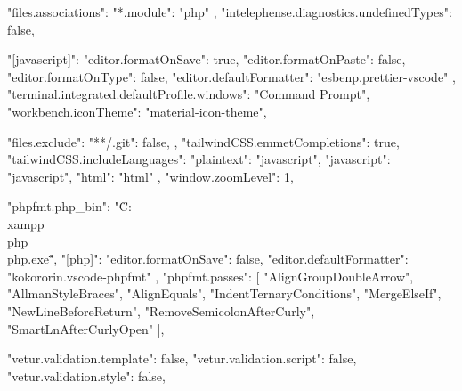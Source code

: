 {
    "files.associations": { "*.module": "php" },
    "intelephense.diagnostics.undefinedTypes": false,

    "[javascript]": {
        "editor.formatOnSave": true,
        "editor.formatOnPaste": false,
        "editor.formatOnType": false,
        "editor.defaultFormatter": "esbenp.prettier-vscode"
        },
        "terminal.integrated.defaultProfile.windows": "Command Prompt",
        "workbench.iconTheme": "material-icon-theme",
        
        
            "files.exclude": {
                "**/.git": false,
            },
            "tailwindCSS.emmetCompletions": true,
            "tailwindCSS.includeLanguages": {
            "plaintext": "javascript",
            "javascript": "javascript",
            "html": "html"
    },
            "window.zoomLevel": 1, 
          
            "phpfmt.php_bin": "\"C:\\xampp\\php\\php.exe\"",
            "[php]": {
                "editor.formatOnSave": false,
                "editor.defaultFormatter": "kokororin.vscode-phpfmt"
            },
            "phpfmt.passes": [
                "AlignGroupDoubleArrow",
                "AllmanStyleBraces",
                "AlignEquals",
                "IndentTernaryConditions",
                "MergeElseIf",
                "NewLineBeforeReturn",
                "RemoveSemicolonAfterCurly",
                "SmartLnAfterCurlyOpen"
            ],

            "vetur.validation.template": false,
            "vetur.validation.script": false,
            "vetur.validation.style": false,
       
            
}